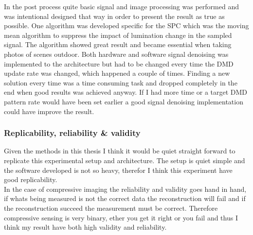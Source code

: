 In the post process quite basic signal and image processing was performed and was intentional designed that way in order to present the result as true as possible. One algorithm was developed specific for the SPC which was the moving mean algorithm to suppress the impact of lumination change in the sampled signal. The algorithm showed great result and became essential when taking photos of scenes outdoor. Both hardware and software signal denoising was implemented to the architecture but had to be changed every time the DMD update rate was changed, which happened a couple of times. Finding a new solution every time was a time consuming task and dropped completely in the end when good results was achieved anyway. If I had more time or a target DMD pattern rate would have been set earlier a good signal denoising implementation could have improve the result.\\[0.1in]

\subsubsection{Replicability, reliability \& validity}
Given the methods in this thesis I think it would be quiet straight forward to replicate this experimental setup and architecture. The setup is quiet simple and the software developed is not so heavy, therefor I think this experiment have good replicability.\\[0.1in]

In the case of compressive imaging the reliability and validity goes hand in hand, if whats being measured is not the correct data the reconstruction will fail and if the reconstruction succeed the measurement must be correct. Therefore compressive sensing is very binary, ether you get it right or you fail and thus I think my result have both high validity and reliability.  

 





